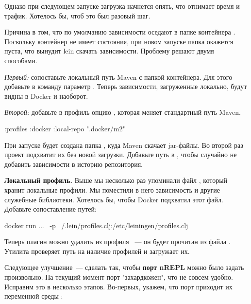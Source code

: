 Однако при следующем запуске загрузка начнется опять, что отнимает время и трафик. Хотелось бы, чтоб это был разовый шаг.

Причина в том, что по умолчанию зависимости оседают в папке контейнера . Поскольку контейнер не имеет состояния, при новом запуске папка окажется пуста, что вынудит lein скачать зависимости. Проблему решают двумя способами.

\emph{Первый:} сопоставьте локальный путь Maven с папкой контейнера. Для этого добавьте в команду  параметр . Теперь зависимости, загруженные локально, будут видны в Docker и наоборот.

\emph{Второй:} добавьте в профиль  опцию , которая меняет стандартный путь Maven.

\begin{english}
  \begin{clojure}
{:profiles
 {:docker {:local-repo ".docker/m2"}}}
  \end{clojure}
\end{english}

При запуске  будет создана папка , куда Maven скачает jar-файлы. Во второй раз проект подхватит их без новой загрузки. Добавьте путь  в , чтобы случайно не добавить зависимости в историю репозитория.

\textbf{Локальный профиль.} Выше мы несколько раз упоминали файл , который хранит локальные профили. Мы поместили в него зависимость  и другие служебные библиотеки. Хотелось бы, чтобы Docker подхватил этот файл. Добавьте сопоставление путей:

\begin{english}
  \begin{bash}
docker run ... \
  -p ~/.lein/profiles.clj:/etc/leiningen/profiles.clj
  \end{bash}
\end{english}

Теперь плагин  можно удалить из профиля ~--- он будет прочитан из файла . Утилита  проверяет путь  на наличие профилей и загружает их.

Следующее улучшение~--- сделать так, чтобы \textbf{порт nREPL} можно было задать произвольно. На текущий момент порт "захардкожен", что не совсем удобно. Исправим это в несколько этапов. Во-первых, укажем, что порт приходит их переменной среды :


